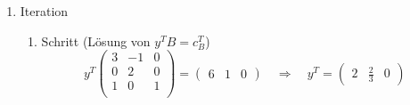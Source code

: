 \documentclass[a4paper]{scrartcl}
\begin{document}
\begin{enumerate}[label=\bfseries\arabic*.]
\begin{enumerate}
\begin{enumerate}[1.]
                    \item Iteration
                        \begin{enumerate}[1.]
                            \item Schritt (Lösung von $y^TB = c_B^T$)
                                \begin{equation}
                                    y^T
                                    \begin{pmatrix}
                                        3 & -1 & 0 \\
                                        0 &  2 & 0 \\
                                        1 &  0 & 1 \\
                                    \end{pmatrix}
                                    =
                                    \begin{pmatrix}
                                        6 & 1 & 0
                                    \end{pmatrix}
                                    \quad\Rightarrow\quad
                                    y^T =
                                    \begin{pmatrix}
                                        2 & \frac{2}{3} & 0
                                    \end{pmatrix}
                                \end{equation}
                                

\end{enumerate}
\end{enumerate}
\end{enumerate}
\end{enumerate}
\end{document}
